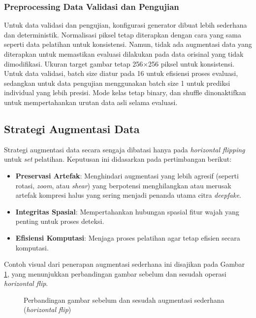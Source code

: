 \subsubsection{Preprocessing Data Validasi dan Pengujian}

Untuk data validasi dan pengujian, konfigurasi generator dibuat lebih sederhana dan deterministik. Normalisasi piksel tetap diterapkan dengan cara yang sama seperti data pelatihan untuk konsistensi. Namun, tidak ada augmentasi data yang diterapkan untuk memastikan evaluasi dilakukan pada data orisinal yang tidak dimodifikasi. Ukuran target gambar tetap 256×256 piksel untuk konsistensi. Untuk data validasi, batch size diatur pada 16 untuk efisiensi proses evaluasi, sedangkan untuk data pengujian menggunakan batch size 1 untuk prediksi individual yang lebih presisi. Mode kelas tetap binary, dan shuffle dinonaktifkan untuk mempertahankan urutan data asli selama evaluasi.

\subsection{Strategi Augmentasi Data}

Strategi augmentasi data secara sengaja dibatasi hanya pada \textit{horizontal flipping} untuk \textit{set} pelatihan. Keputusan ini didasarkan pada pertimbangan berikut:
\begin{itemize}
    \item \textbf{Preservasi Artefak}: Menghindari augmentasi yang lebih agresif (seperti rotasi, \textit{zoom}, atau \textit{shear}) yang berpotensi menghilangkan atau merusak artefak kompresi halus yang sering menjadi penanda utama citra \textit{deepfake}.
    \item \textbf{Integritas Spasial}: Mempertahankan hubungan spasial fitur wajah yang penting untuk proses deteksi.
    \item \textbf{Efisiensi Komputasi}: Menjaga proses pelatihan agar tetap efisien secara komputasi.
\end{itemize}
Contoh visual dari penerapan augmentasi sederhana ini disajikan pada Gambar \ref{fig:augmentation_simple}, yang menunjukkan perbandingan gambar sebelum dan sesudah operasi \textit{horizontal flip}.

\begin{figure}[h]
\centering
\caption{Perbandingan gambar sebelum dan sesudah augmentasi sederhana (\textit{horizontal flip})}
\label{fig:augmentation_simple}
\end{figure}

